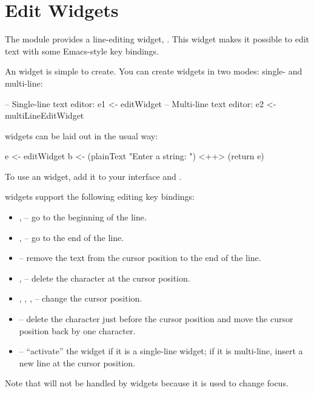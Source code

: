 \section{Edit Widgets}
\label{sec:edit}

The  module provides a line-editing widget, .
This widget makes it possible to edit text with some Emacs-style key
bindings.

An  widget is simple to create.  You can create 
widgets in two modes: single- and multi-line:

\begin{haskellcode}
 -- Single-line text editor:
 e1 <- editWidget
 -- Multi-line text editor:
 e2 <- multiLineEditWidget
\end{haskellcode}

 widgets can be laid out in the usual way:

\begin{haskellcode}
 e <- editWidget
 b <- (plainText "Enter a string: ") <++> (return e)
\end{haskellcode}

To use an  widget, add it to your interface and
.

 widgets support the following editing key bindings:

\begin{itemize}
\item {},  -- go to the beginning of the line.
\item {},  -- go to the end of the line.
\item {} -- remove the text from the cursor position to the
  end of the line.
\item {},  -- delete the character at the cursor
  position.
\item {}, , ,  -- change the cursor
  position.
\item {} -- delete the character just before the cursor
  position and move the cursor position back by one character.
\item {} -- ``activate'' the  widget if it is a
  single-line widget; if it is multi-line, insert a new line at the
  cursor position.
\end{itemize}

Note that  will not be handled by  widgets because it
is used to change focus.

